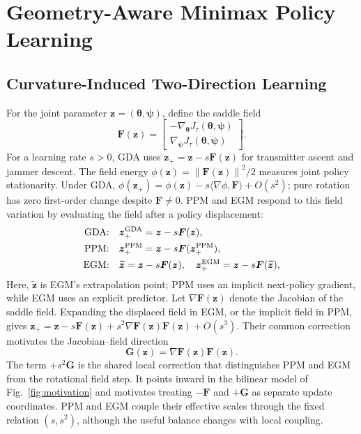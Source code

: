\documentclass[conference]{IEEEtran}
\newcommand{\bF}{\bm{F}}
\newcommand{\bG}{\bm{G}}
\newcommand{\bz}{\bm{z}}
\newcommand{\btheta}{\bm{\theta}}
\newcommand{\bpsi}{\bm{\psi}}
\newcommand{\norm}[1]{\left\lVert #1\right\rVert}
\begin{document}
\section{Geometry-Aware Minimax Policy Learning}
\subsection{Curvature-Induced Two-Direction Learning}
For the joint parameter $\bz=(\btheta,\bpsi)$, define the saddle field
\begin{equation}
\bF(\bz)=
\begin{bmatrix}
-\nabla_{\btheta}J_\tau(\btheta,\bpsi)\\
\nabla_{\bpsi}J_\tau(\btheta,\bpsi)
\end{bmatrix}.
\label{eq:field}
\end{equation}
For a learning rate $s>0$, GDA uses $\bz_+=\bz-s\bF(\bz)$ for transmitter ascent and jammer descent.
The field energy $\phi(\bz)=\norm{\bF(\bz)}^2/2$ measures joint policy stationarity.
Under GDA, $\phi(\bz_+)=\phi(\bz)-s\langle\nabla\phi,\bF\rangle+O(s^2)$; pure rotation has zero first-order change despite $\bF\neq0$.
PPM and EGM respond to this field variation by evaluating the field after a policy displacement:
\[
\begin{aligned}
\textnormal{GDA:}\quad &\bz_{+}^{\rm GDA}=\bz-s\bF(\bz),\\
\textnormal{PPM:}\quad &\bz_{+}^{\rm PPM}=\bz-s\bF(\bz_{+}^{\rm PPM}),\\
\textnormal{EGM:}\quad &\widetilde{\bz}=\bz-s\bF(\bz),\quad
\bz_{+}^{\rm EGM}=\bz-s\bF(\widetilde{\bz}),
\end{aligned}
\]
Here, $\widetilde{\bz}$ is EGM's extrapolation point; PPM uses an implicit next-policy gradient, while EGM uses an explicit predictor.
Let $\nabla\bF(\bz)$ denote the Jacobian of the saddle field.
Expanding the displaced field in EGM, or the implicit field in PPM, gives $\bz_+=\bz-s\bF(\bz)+s^2\nabla\bF(\bz)\bF(\bz)+O(s^3)$.
Their common correction motivates the Jacobian--field direction
\begin{equation}
\bG(\bz)=\nabla\bF(\bz)\bF(\bz).
\label{eq:g_direction}
\end{equation}
The term $+s^2\bG$ is the shared local correction that distinguishes PPM and EGM from the rotational field step.
It points inward in the bilinear model of Fig.~\ref{fig:motivation} and motivates treating $-\bF$ and $+\bG$ as separate update coordinates.
PPM and EGM couple their effective scales through the fixed relation $(s,s^2)$, although the useful balance changes with local coupling.
\end{document}
